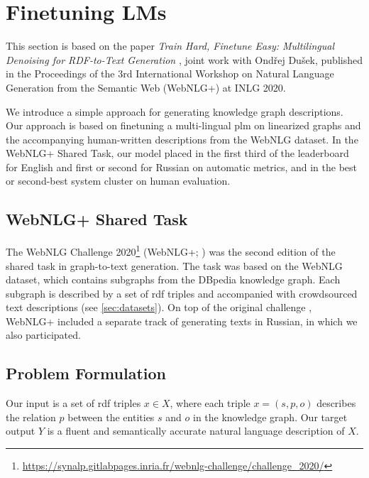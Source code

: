 \section{Finetuning LMs}
\label{sec:finetuning}

\begin{refbox}
    This section is based on the paper \emph{Train Hard, Finetune Easy: Multilingual Denoising for RDF-to-Text Generation} \cite{kasnerTrainHardFinetune2020}, joint work with Ondřej Dušek, published in the Proceedings of the 3rd International Workshop on Natural Language Generation from the Semantic Web (WebNLG+) at INLG 2020.
\end{refbox}


We introduce a simple approach for generating knowledge graph descriptions. Our approach is based on finetuning a multi-lingual \ac{plm} on linearized graphs and the accompanying human-written descriptions from the WebNLG dataset. In the WebNLG+ Shared Task, our model placed in the first third of the leaderboard for English and first or second for Russian on automatic metrics, and in the best or second-best system cluster on human evaluation.

\subsection{WebNLG+ Shared Task}
\label{sec:webnlgp}
The WebNLG Challenge 2020\footnote{\url{https://synalp.gitlabpages.inria.fr/webnlg-challenge/challenge_2020/}} (WebNLG+; \citealp{ferreira20202020}) was the second edition of the shared task in graph-to-text generation. The task was based on the WebNLG dataset, which contains subgraphs from the DBpedia knowledge graph. Each subgraph is described by a set of \ac{rdf} triples and accompanied with crowdsourced text descriptions (see \autoref{sec:datasets}). On top of the original challenge \cite{gardentWebNLGChallengeGenerating2017}, WebNLG+ included a separate track of generating texts in Russian, in which we also participated.


\subsection{Problem Formulation}
\label{sec:mbart}
Our input is a set of \ac{rdf} triples $x \in X$, where each triple $x = (s, p, o)$ describes the relation $p$ between the entities $s$ and $o$ in the knowledge graph. Our target output $Y$ is a fluent and semantically accurate natural language description of $X$.



